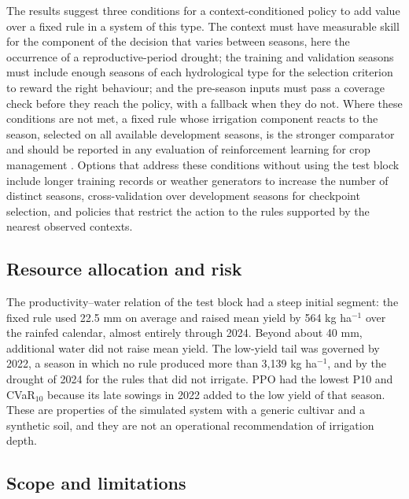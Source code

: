 \documentclass[times,final,authoryear]{elsarticle}
\begin{document}
The results suggest three conditions for a context-conditioned policy to add value over a fixed rule in a system of this type. The context must have measurable skill for the component of the decision that varies between seasons, here the occurrence of a reproductive-period drought; the training and validation seasons must include enough seasons of each hydrological type for the selection criterion to reward the right behaviour; and the pre-season inputs must pass a coverage check before they reach the policy, with a fallback when they do not. Where these conditions are not met, a fixed rule whose irrigation component reacts to the season, selected on all available development seasons, is the stronger comparator and should be reported in any evaluation of reinforcement learning for crop management \citep{balderas2025comparative, noa2026hybrid}. Options that address these conditions without using the test block include longer training records or weather generators to increase the number of distinct seasons, cross-validation over development seasons for checkpoint selection, and policies that restrict the action to the rules supported by the nearest observed contexts.

\subsection{Resource allocation and risk}
\label{subdisc_resources}

The productivity--water relation of the test block had a steep initial segment: the fixed rule used 22.5 mm on average and raised mean yield by 564 kg ha$^{-1}$ over the rainfed calendar, almost entirely through 2024. Beyond about 40 mm, additional water did not raise mean yield. The low-yield tail was governed by 2022, a season in which no rule produced more than 3,139 kg ha$^{-1}$, and by the drought of 2024 for the rules that did not irrigate. PPO had the lowest P10 and CVaR$_{10}$ because its late sowings in 2022 added to the low yield of that season. These are properties of the simulated system with a generic cultivar and a synthetic soil, and they are not an operational recommendation of irrigation depth.

\subsection{Scope and limitations}
\label{subdisc_limitations}
\end{document}
